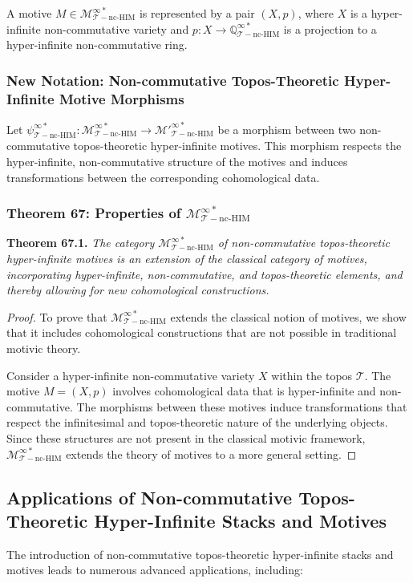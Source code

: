 \documentclass{article}
\begin{document}
A motive \(M \in \mathcal{M}_{\mathcal{T}-\text{nc-HIM}}^{\infty *}\) is represented by a pair \((X, p)\), where \(X\) is a hyper-infinite non-commutative variety and \(p: X \to \mathbb{Q}_{\mathcal{T}-\text{nc-HIM}}^{\infty *}\) is a projection to a hyper-infinite non-commutative ring.

\subsubsection{New Notation: Non-commutative Topos-Theoretic Hyper-Infinite Motive Morphisms}
Let \(\psi_{\mathcal{T}-\text{nc-HIM}}^{\infty *}: \mathcal{M}_{\mathcal{T}-\text{nc-HIM}}^{\infty *} \to \mathcal{M}'_{\mathcal{T}-\text{nc-HIM}}^{\infty *}\) be a morphism between two non-commutative topos-theoretic hyper-infinite motives. This morphism respects the hyper-infinite, non-commutative structure of the motives and induces transformations between the corresponding cohomological data.

\subsubsection{Theorem 67: Properties of \(\mathcal{M}_{\mathcal{T}-\text{nc-HIM}}^{\infty *}\)}
\textbf{Theorem 67.1.} \textit{The category \(\mathcal{M}_{\mathcal{T}-\text{nc-HIM}}^{\infty *}\) of non-commutative topos-theoretic hyper-infinite motives is an extension of the classical category of motives, incorporating hyper-infinite, non-commutative, and topos-theoretic elements, and thereby allowing for new cohomological constructions.}

\begin{proof}
To prove that \(\mathcal{M}_{\mathcal{T}-\text{nc-HIM}}^{\infty *}\) extends the classical notion of motives, we show that it includes cohomological constructions that are not possible in traditional motivic theory.

Consider a hyper-infinite non-commutative variety \(X\) within the topos \(\mathcal{T}\). The motive \(M = (X, p)\) involves cohomological data that is hyper-infinite and non-commutative. The morphisms between these motives induce transformations that respect the infinitesimal and topos-theoretic nature of the underlying objects. Since these structures are not present in the classical motivic framework, \(\mathcal{M}_{\mathcal{T}-\text{nc-HIM}}^{\infty *}\) extends the theory of motives to a more general setting.
\end{proof}

\subsection{Applications of Non-commutative Topos-Theoretic Hyper-Infinite Stacks and Motives}
The introduction of non-commutative topos-theoretic hyper-infinite stacks and motives leads to numerous advanced applications, including:
\end{document}
